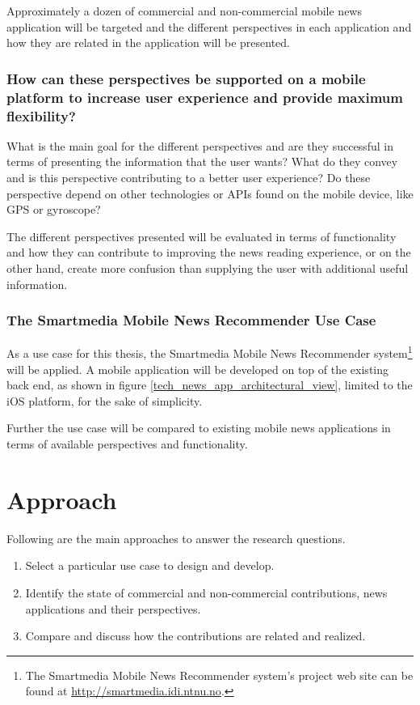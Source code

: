 Approximately a dozen of commercial and non-commercial mobile news application will be targeted and the different perspectives in each application and how they are related in the application will be presented.


\subsubsection{How can these perspectives be supported on a mobile platform to increase user experience and provide maximum flexibility?}

What is the main goal for the different perspectives and are they successful in terms of presenting the information that the user wants? What do they convey and is this perspective contributing to a better user experience? Do these perspective depend on other technologies or APIs found on the mobile device, like GPS or gyroscope?

The different perspectives presented will be evaluated in terms of functionality and how they can contribute to improving the news reading experience, or on the other hand, create more confusion than supplying the user with additional useful information.


\subsubsection{The Smartmedia Mobile News Recommender Use Case}
As a use case for this thesis, the Smartmedia Mobile News Recommender system\footnote{The Smartmedia Mobile News Recommender system's project web site can be found at \url{http://smartmedia.idi.ntnu.no}.} will be applied. A mobile application will be developed on top of the existing back end, as shown in figure \ref{tech_news_app_architectural_view}, limited to the iOS platform, for the sake of simplicity.

Further the use case will be compared to existing mobile news applications in terms of available perspectives and functionality.

\section{Approach}
Following are the main approaches to answer the research questions.

\begin{enumerate}
	\item Select a particular use case to design and develop.
	\item Identify the state of commercial and non-commercial contributions, news applications and their perspectives.
	\item Compare and discuss how the contributions are related and realized.
\end{enumerate}


